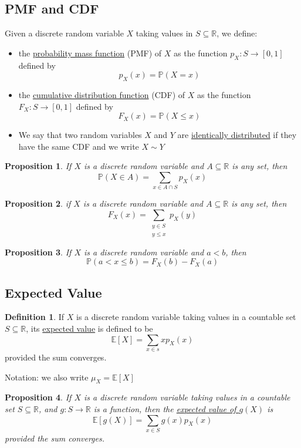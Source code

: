 \documentclass[
]{article}
\newtheorem{proposition}{Proposition}[section]
\theoremstyle{definition}
\newtheorem{definition}{Definition}[section]
\theoremstyle{definition}
\theoremstyle{definition}
\theoremstyle{remark}
\newcommand{\prob}[1]{\mathbb{P}\left(#1\right)}
\newcommand{\pxx}{p_X(x)}
\newcommand{\R}{\mathbb{R}}
\newcommand{\E}[1]{\mathbb{E}[#1]}
\newcommand{\sse}{\subseteq}
\begin{document}
\subsection{PMF and CDF}

Given a discrete random variable $X$ taking values in $S\subseteq\R$, we define:
\begin{itemize}
  \item the \underline{probability mass function} (PMF) of $X$ as the function $p_X:S\to[0,1]$ defined by
        \[p_X(x)=\prob{X=x}\]
  \item the \underline{cumulative distribution function} (CDF) of $X$ as the function $F_X:S\to[0,1]$ defined by
        \[F_X(x)=\prob{X\leq x}\]
  \item We say that two random variables $X$ and $Y$ are \underline{identically distributed} if they have the same CDF and we write $X\sim Y$
\end{itemize}

\begin{proposition}
  If $X$ is a discrete random variable and $A\subseteq\R$ is any set, then
  \[\prob{X\in A}=\sum_{x\in A\cap S}p_X(x)\]
\end{proposition}

\begin{proposition}
  if $X$ is a discrete random variable and $A\sse\R$ is any set, then
  \[F_X(x)=\sum_{\substack{y\in S\\y\leq x}}p_X(y)\]
\end{proposition}

\begin{proposition}
  If $X$ is a discrete random variable and $a<b$, then
  \[\prob{a<x\leq b}=F_X(b)-F_X(a)\]
\end{proposition}

\subsection{Expected Value}

\begin{definition}
  If $X$ is a discrete random variable taking values in a countable set $S\sse\R$, its \underline{expected value} is defined to be
  \[\E{X}=\sum_{x\in s}x\pxx\]
  provided the sum converges.

  Notation: we also write $\mu_X=\E{X}$
\end{definition}

\begin{proposition}
  If $X$ is a discrete random variable taking values in a countable set $S\sse\R$, and $g:S\to\R$ is a function, then the \underline{expected value of $g(X)$} is
  \[\E{g(X)}=\sum_{x\in S}g(x)\pxx\]
  provided the sum converges.
\end{proposition}
\end{document}
